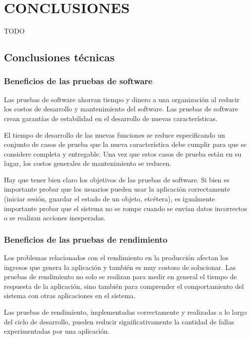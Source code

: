 \chapter{CONCLUSIONES\label{sec:conclusiones}}

\clearpage

TODO

\section{Conclusiones técnicas}

\subsection{Beneficios de las pruebas de software}

Las pruebas de software ahorran tiempo y dinero a una organización al reducir los costos de desarrollo y mantenimiento del software. Las pruebas de software crean garantías de estabilidad en el desarrollo de nuevas características.

El tiempo de desarrollo de las nuevas funciones se reduce especificando un conjunto de casos de prueba que la nueva característica debe cumplir para que se considere completa y entregable. Una vez que estos casos de prueba están en su lugar, los costos generales de mantenimiento se reducen.

Hay que tener bien claro los objetivos de las pruebas de software. Si bien es importante probar que los usuarios pueden usar la aplicación correctamente (iniciar sesión, guardar el estado de un objeto, etcétera), es igualmente importante probar que el sistema no se rompe cuando se envían datos incorrectos o se realizan acciones inesperadas.

\subsection{Beneficios de las pruebas de rendimiento}

Los problemas relacionados con el rendimiento en la producción afectan los ingresos que genera la aplicación y también es muy costoso de solucionar. Las pruebas de rendimiento no solo se realizan para medir en general el tiempo de respuesta de la aplicación, sino también para comprender el comportamiento del sistema con otras aplicaciones en el sistema.

Las pruebas de rendimiento, implementadas correctamente y realizadas a lo largo del ciclo de desarrollo, pueden reducir significativamente la cantidad de fallas experimentadas por una aplicación.

